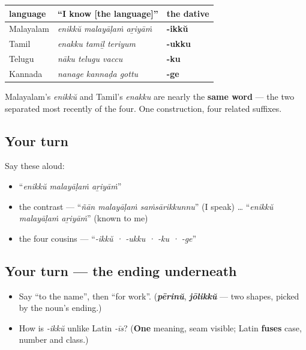 \begin{cousinweb}
\noindent
\begin{tabularx}{\linewidth}{@{}>{\raggedright\arraybackslash}X>{\raggedright\arraybackslash}X>{\raggedright\arraybackslash}X@{}}
\toprule
\textbf{language} & \textbf{\textquotedblleft{}I know {[}the language{]}\textquotedblright{}} & \textbf{the dative} \\
\midrule
Malayalam & \emph{enikkŭ malayāḷaṁ aṟiyāṁ} & \textbf{-ikkŭ} \\
Tamil & \emph{enakku tamiḻ teriyum} & \textbf{-ukku} \\
Telugu & \emph{nāku telugu vaccu} & \textbf{-ku} \\
Kannada & \emph{nanage kannaḍa gottu} & \textbf{-ge} \\
\bottomrule
\end{tabularx}

Malayalam's \emph{enikkŭ} and Tamil's \emph{enakku} are nearly the \textbf{same word} — the two separated most recently of the four. One construction, four related suffixes.
\end{cousinweb}

\subsection*{Your turn}
Say these aloud:

\begin{itemize}
\raggedright
  \item \textquotedblleft{}\emph{enikkŭ malayāḷaṁ aṟiyāṁ}\textquotedblright{}
  \item the contrast — \textquotedblleft{}\emph{ñān malayāḷaṁ saṁsārikkunnu}\textquotedblright{} (I speak) … \textquotedblleft{}\emph{enikkŭ malayāḷaṁ aṟiyāṁ}\textquotedblright{} (known to me)
  \item the four cousins — \textquotedblleft{}\emph{-ikkŭ · -ukku · -ku · -ge}\textquotedblright{}
\end{itemize}

\subsection*{Your turn — the ending underneath}
\begin{itemize}
\raggedright
  \item Say \textquotedblleft{}to the name\textquotedblright{}, then \textquotedblleft{}for work\textquotedblright{}. (\emph{\textbf{pērinŭ}}, \emph{\textbf{jōlikkŭ}} — two shapes, picked by the noun's ending.)
  \item How is \emph{-ikkŭ} unlike Latin \emph{-īs}? (\textbf{One} meaning, seam visible; Latin \textbf{fuses} case, number and class.)
\end{itemize}

